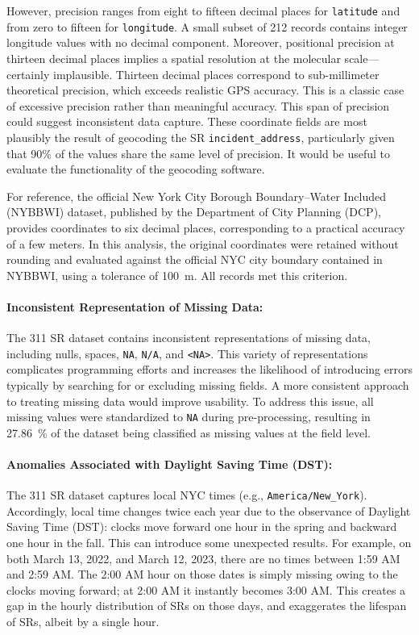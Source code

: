 \documentclass[linenumber]{jdsart}
\begin{document}
However, precision ranges from eight to fifteen decimal places
for \texttt{latitude} and from zero to fifteen for
\texttt{longitude}. A small subset of \num{212} records contains
integer longitude values with no decimal component.
 Moreover, positional precision at thirteen decimal places
implies a spatial resolution at the molecular scale—certainly 
implausible. Thirteen decimal places correspond to sub-millimeter theoretical 
precision, which exceeds realistic GPS accuracy. This is a classic case of 
excessive precision rather than meaningful accuracy. This span of precision 
could suggest inconsistent data capture. These coordinate 
fields are most plausibly the result of geocoding the SR \texttt{incident\_address}, 
particularly given that 90\% of the values share the same level of precision.
 It would be useful to evaluate the functionality of the geocoding software. 

For reference, the official New York City Borough Boundary--Water Included
 (\textsc{NYBBWI}) dataset, published by the Department of City Planning (DCP),
provides coordinates to six decimal places, corresponding to a practical
accuracy of a few meters. In this analysis, the original coordinates were retained without
rounding and evaluated against the official NYC city boundary
contained in \textsc{NYBBWI}, using a tolerance of \SI{100}{\meter}.
All records met this criterion.

 
\paragraph{Inconsistent Representation of Missing Data:} 
The 311 SR dataset contains inconsistent representations
of missing data, including nulls, spaces, \texttt{NA},
\texttt{N/A}, and \texttt{<NA>}. This variety of representations 
complicates programming efforts and increases the likelihood 
of introducing errors typically by searching for or excluding 
missing fields. A more consistent approach to treating missing data 
would improve usability. To address this issue, all missing values were standardized
to \texttt{NA} during pre-processing, resulting in 
\SI[round-mode=places, round-precision=2]{27.86}{\percent} of the 
dataset being classified as missing values at the field level.


\paragraph{Anomalies Associated with Daylight Saving Time (DST):}
\label{par:dstsystemic}
 The 311 SR dataset captures local NYC times 
 (e.g., \texttt{America/New\_York}). 
Accordingly, local time changes twice each year due to the observance
of Daylight Saving Time (DST): clocks move forward one hour in the
spring and backward one hour in the fall. This can introduce 
some unexpected results. For example, 
on both March 13, 2022, and March 12, 2023, there are no times 
between 1:59 AM and 2:59 AM. The 2:00 AM hour on those dates 
is simply missing owing to the clocks moving forward; at 2:00 AM 
it instantly becomes 3:00 AM. This creates a gap in the hourly 
distribution of SRs on those days, and exaggerates the 
lifespan of SRs, albeit by a single hour. 
\end{document}
